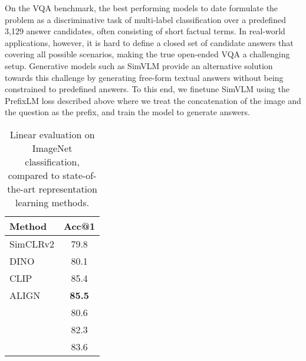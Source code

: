 \documentclass{article} \usepackage{iclr2022_conference,times}
\newcommand{\ours}{SimVLM}
\begin{document}
On the VQA benchmark, the best performing models to date formulate the problem as a discriminative task of multi-label classification over a predefined 3,129 answer candidates, often consisting of short factual terms. In real-world applications, however, it is hard to define a closed set of candidate answers that covering all possible scenarios, making the true open-ended VQA a challenging setup.
Generative models such as {\ours} provide an alternative solution towards this challenge by generating free-form textual answers without being constrained to predefined answers. To this end, we finetune {\ours} using the PrefixLM loss described above where we treat the concatenation of the image and the question as the prefix, and train the model to generate answers.

\begin{wraptable}{r}{0.5\textwidth}
\begin{center}
\begin{small}
\begin{tabular}{l | c }
\toprule
Method & Acc@1 \\
\bottomrule
\toprule
SimCLRv2 \citep{chen2020big} & 79.8\\
DINO \citep{caron2021emerging} & 80.1 \\
CLIP \citep{radford2021learning} & 85.4 \\
ALIGN \citep{jia2021scaling} & \bf 85.5 \\
 & 80.6\\
 & 82.3\\
 & 83.6\\
\bottomrule
\end{tabular}
\end{small}
\end{center}
\caption[caption]{Linear evaluation on ImageNet classification, compared to state-of-the-art representation learning methods.} 
\label{tab:imagenet}
\end{wraptable}
\end{document}
